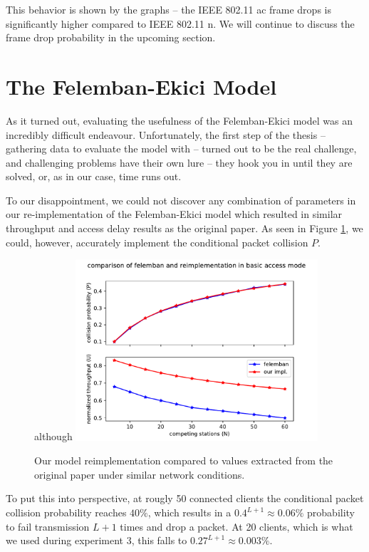 This behavior is shown by the graphs -- the IEEE 802.11 ac frame drops is
significantly higher compared to IEEE 802.11 n. We will continue to discuss
the frame drop probability in the upcoming section.

\section{The Felemban-Ekici Model}

As it turned out, evaluating the usefulness of the Felemban-Ekici model was an
incredibly difficult endeavour. Unfortunately, the first step of the thesis --
gathering data to evaluate the model with -- turned out to be the real
challenge, and challenging problems have their own lure -- they hook you in
until they are solved, or, as in our case, time runs out.

To our disappointment, we could not discover any combination of parameters in
our re-implementation of the Felemban-Ekici model which resulted in similar
throughput and access delay results as the original paper. As seen in Figure
\ref{fig:modelimpl}, we could, however, accurately implement the conditional
packet collision $P$.

\begin{figure}[tbp]although
  \centering
  \includegraphics[width=0.8\textwidth]{images/reimpl.pdf}
  \caption{Our model reimplementation compared to values extracted from the original paper under similar network conditions.}
  \label{fig:modelimpl}
\end{figure}

To put this into perspective, at rougly 50 connected clients the conditional
packet collision probability reaches $40\%$, which results in a $0.4^{L+1}
\approx 0.06\%$ probability to fail transmission $L+1$ times and drop a
packet. At 20 clients, which is what we used during experiment 3, this falls
to $0.27^{L+1} \approx 0.003\%$.


